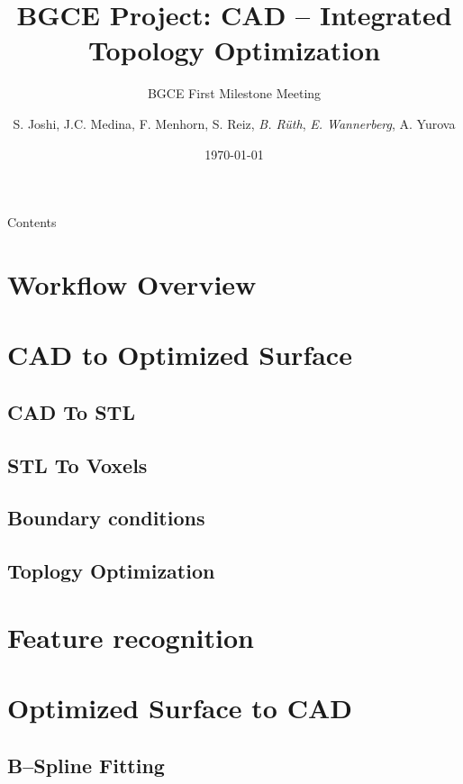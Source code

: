 \documentclass[9pt,pdftex]{beamer}
\title{BGCE Project: CAD -- Integrated Topology Optimization}
\subtitle{BGCE First Milestone Meeting}
\author[E. Wannerberg, B. Rüth] {S. Joshi, J.C. Medina, F. Menhorn, S. Reiz, \textit{B. Rüth}, \textit{E. Wannerberg}, A. Yurova} %
\date{\today}
\institute{Technische Universität München}
\begin{document}
\titlepage
\begin{frame}{Contents}
\tableofcontents
\end{frame}
\section{Workflow Overview}


\section{CAD to Optimized Surface}


\subsection{CAD To STL}



\subsection{STL To Voxels}



\subsection{Boundary conditions}



\subsection{Toplogy Optimization}



\section{Feature recognition}



\section{Optimized Surface to CAD}

\subsection{B--Spline Fitting}

\end{document}
